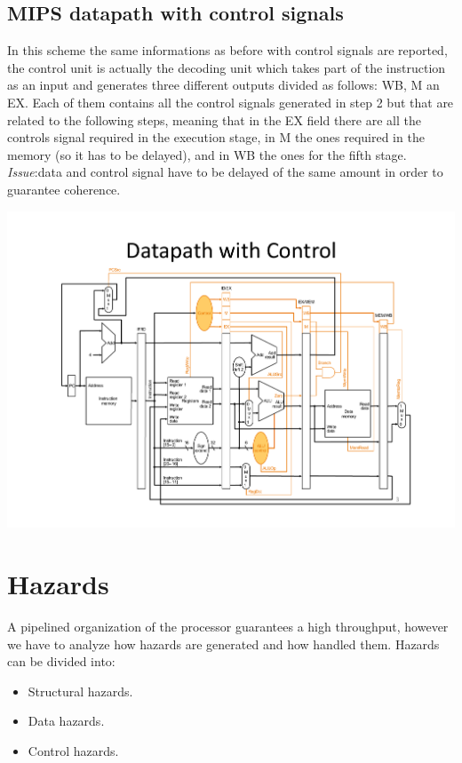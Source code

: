 \subsection{MIPS datapath with control signals}
In this scheme the same informations as before with control signals are
reported, the control unit is actually the decoding unit which takes part of the
instruction as an input and generates three different outputs divided as
follows: WB, M an EX. Each of them contains all the control signals generated in
step 2 but that are related to the following steps, meaning that in the EX field
there are all the controls signal required in the execution stage, in M the ones
required in the memory (so it has to be delayed), and in WB  the ones for the
fifth stage.\\
\textit{Issue}:data and control signal have to be delayed of the same amount in
order to guarantee coherence.
\begin{center}
  \includegraphics[width=1.0\linewidth]{img/img3/mips2}
\end{center}
\section{Hazards}
A pipelined organization of the processor guarantees a high throughput, however
we have to analyze how hazards are generated and how handled them. Hazards can
be divided into:
\begin{itemize}
  \item Structural hazards.
  \item Data hazards.
  \item Control hazards.
\end{itemize}
